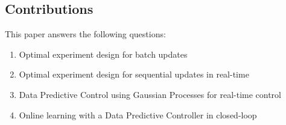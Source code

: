 \subsection{Contributions}


This paper answers the following questions:
\begin{enumerate}
	\item Optimal experiment design for batch updates
	\item Optimal experiment design for sequential updates in real-time
	\item Data Predictive Control using Gaussian Processes for real-time control
	\item Online learning with a Data Predictive Controller in closed-loop
\end{enumerate}



